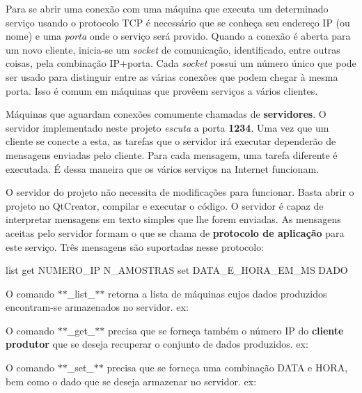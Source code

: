 Para se abrir uma conexão com uma máquina que executa um determinado serviço usando o protocolo T\+CP é necessário que se conheça seu endereço IP (ou nome) e uma {\itshape porta} onde o serviço será provido. Quando a conexão é aberta para um novo cliente, inicia-\/se um {\itshape socket} de comunicação, identificado, entre outras coisas, pela combinação I\+P+porta. Cada {\itshape socket} possui um número único que pode ser usado para distinguir entre as várias conexões que podem chegar à mesma porta. Isso é comum em máquinas que provêem serviços a vários clientes.

Máquinas que aguardam conexões comumente chamadas de {\bfseries servidores}. O servidor implementado neste projeto {\itshape escuta} a porta {\bfseries 1234}. Uma vez que um cliente se conecte a esta, as tarefas que o servidor irá executar dependerão de mensagens enviadas pelo cliente. Para cada mensagem, uma tarefa diferente é executada. É dessa maneira que os vários serviços na Internet funcionam.

O servidor do projeto não necessita de modificações para funcionar. Basta abrir o projeto no Qt\+Creator, compilar e executar o código. O servidor é capaz de interpretar mensagens em texto simples que lhe forem enviadas. As mensagens aceitas pelo servidor formam o que se chama de {\bfseries protocolo de aplicação} para este serviço. Três mensagens são suportadas nesse protocolo\+:


\begin{DoxyCode}
list
get NUMERO\_IP N\_AMOSTRAS
set DATA\_E\_HORA\_EM\_MS DADO
\end{DoxyCode}


O comando $\ast$$\ast$\+\_\+list\+\_\+$\ast$$\ast$ retorna a lista de máquinas cujos dados produzidos encontram-\/se armazenados no servidor. ex\+: 


O comando $\ast$$\ast$\+\_\+get\+\_\+$\ast$$\ast$ precisa que se forneça também o número IP do {\bfseries cliente produtor} que se deseja recuperar o conjunto de dados produzidos. ex\+:




O comando $\ast$$\ast$\+\_\+set\+\_\+$\ast$$\ast$ precisa que se forneça uma combinação D\+A\+TA e H\+O\+RA, bem como o dado que se deseja armazenar no servidor. ex\+:


